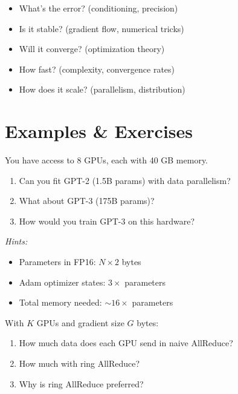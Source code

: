 \begin{itemize}
    \item What's the error? (conditioning, precision)
    \item Is it stable? (gradient flow, numerical tricks)
    \item Will it converge? (optimization theory)
    \item How fast? (complexity, convergence rates)
    \item How does it scale? (parallelism, distribution)
\end{itemize}






\newpage
\section{Examples \& Exercises}


 You have access to 8 GPUs, each with 40 GB memory.
\begin{enumerate}
    \item Can you fit GPT-2 (1.5B params) with data parallelism?
    \item What about GPT-3 (175B params)?
    \item How would you train GPT-3 on this hardware?
\end{enumerate}

\textit{Hints:}
\begin{itemize}
    \item Parameters in FP16: $N \times 2$ bytes
    \item Adam optimizer states: $3 \times$ parameters
    \item Total memory needed: $\sim 16 \times$ parameters
\end{itemize}


\vspace{2em}
 With $K$ GPUs and gradient size $G$ bytes:
\begin{enumerate}
    \item How much data does each GPU send in naive AllReduce?
    \item How much with ring AllReduce?
    \item Why is ring AllReduce preferred?
\end{enumerate}



